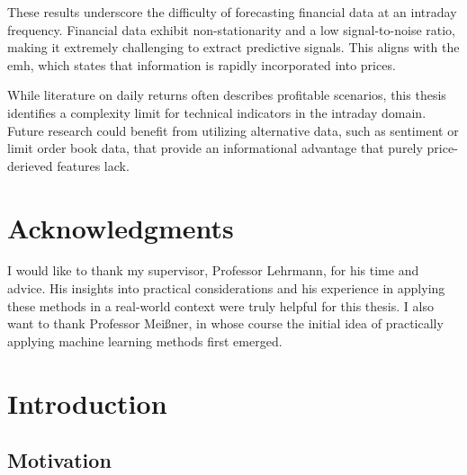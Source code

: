 \documentclass[12pt,twoside=false,a4paper,parskip]{scrbook}
\begin{document}
These results underscore the difficulty of forecasting financial data at an intraday frequency. Financial data exhibit non-stationarity and a low signal-to-noise ratio, making it extremely challenging to extract predictive signals. This aligns with the \gls{emh}, which states that information is rapidly incorporated into prices.

While literature on daily returns often describes profitable scenarios, this thesis identifies a complexity limit for technical indicators in the intraday domain. Future research could benefit from utilizing alternative data, such as sentiment or limit order book data, that provide an informational advantage that purely price-derieved features lack.


\newpage
\chapter*{Acknowledgments}

I would like to thank my supervisor, Professor Lehrmann, for his time and advice. His insights into practical considerations and his experience in applying these methods in a real-world context were truly helpful for this thesis. I also want to thank Professor Meißner, in whose course the initial idea of practically applying machine learning methods first emerged.



\tableofcontents


\printnoidxglossary[type=\acronymtype, title={List of Abbreviations}]
\newpage

\listoffigures
{}

\listoftables
{}



\mainmatter

\chapter{Introduction}


\section{Motivation}
\end{document}
